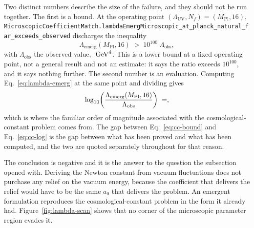 \documentclass[aps,prd,nofootinbib,superscriptaddress,12pt]{revtex4-2}
\DeclareRobustCommand{\lb}{\discretionary{}{}{}}
\begin{document}
Two distinct numbers describe the size of the failure, and they should not be
run together. The first is a bound. At the operating point
$(\Lambda_{\mathrm{UV}}, N_f) = (M_{\mathrm{Pl}}, 16)$,
\texttt{Microscopic\lb{}Coefficient\lb{}Match.\lb{}lambda\lb{}Emerg\lb{}Microscopic\_\lb{}at\_\lb{}planck\_\lb{}natural\_\lb{}far\_\lb{}exceeds\_\lb{}observed}
discharges the inequality
\begin{equation}
\label{eq:cc-bound}
\Lambda_{\mathrm{emerg}}(M_{\mathrm{Pl}}, 16)
\;>\; 10^{100}\;\Lambda_{\mathrm{obs}} ,
\end{equation}
with $\Lambda_{\mathrm{obs}}$ the observed value,
$\unskip\ \mathrm{GeV}^{4}$. This is a
lower bound at a fixed operating point, not a general result and not an
estimate: it says the ratio exceeds $10^{100}$, and it says nothing further. The
second number is an evaluation. Computing Eq.~\eqref{eq:lambda-emerg} at the
same point and dividing gives
\begin{equation}
\label{eq:cc-log}
\log_{10}\!\left(
\frac{\Lambda_{\mathrm{emerg}}(M_{\mathrm{Pl}}, 16)}{\Lambda_{\mathrm{obs}}}
\right)
\;=\; \unskip ,
\end{equation}
which is where the familiar order of magnitude associated with the
cosmological-constant problem \cite{Weinberg1989} comes from. The gap between
Eq.~\eqref{eq:cc-bound} and Eq.~\eqref{eq:cc-log} is the gap between what has
been proved and what has been computed, and the two are quoted separately
throughout for that reason.

The conclusion is negative and it is the answer to the question the subsection
opened with. Deriving the Newton constant from vacuum fluctuations does not
purchase any relief on the vacuum energy, because the coefficient that delivers
the relief would have to be the same $a_0$ that delivers the problem. An
emergent formulation reproduces the cosmological-constant problem in the form it
already had. Figure~\ref{fig:lambda-scan} shows that no corner of the
microscopic parameter region evades it.
\end{document}

